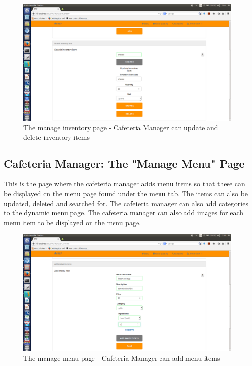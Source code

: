 \documentclass[a4paper,12pt]{report}
\begin{document}
\begin{figure}[H]
  \centering
    \includegraphics[width=1.0\textwidth]{screenshots/updateInv.png}
    \caption{The manage inventory page - Cafeteria Manager can update and delete inventory items}
\end{figure}
\subsection{Cafeteria Manager: The "Manage Menu" Page}
This is the page where the cafeteria manager adds menu items so that these can be displayed on the menu page found under the menu tab. The items can also be updated, deleted and searched for. The cafeteria manager can also add categories to the dynamic menu page. The cafeteria manager can also add images for each menu item to be displayed on the menu page.

\begin{figure}[H]
  \centering
    \includegraphics[width=1.0\textwidth]{screenshots/addMenu.png}
    \caption{The manage menu page - Cafeteria Manager can add menu items}
\end{figure}
\end{document}
